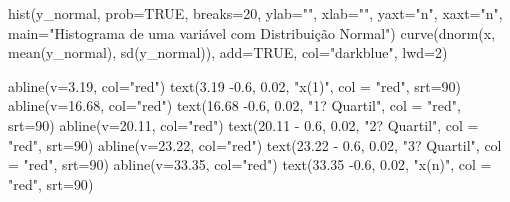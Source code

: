 \documentclass[
]{book}
\newenvironment{Shaded}{\begin{snugshade}}{\end{snugshade}}
\newcommand{\AttributeTok}[1]{\textcolor[rgb]{0.77,0.63,0.00}{#1}}
\newcommand{\ConstantTok}[1]{\textcolor[rgb]{0.00,0.00,0.00}{#1}}
\newcommand{\DecValTok}[1]{\textcolor[rgb]{0.00,0.00,0.81}{#1}}
\newcommand{\FloatTok}[1]{\textcolor[rgb]{0.00,0.00,0.81}{#1}}
\newcommand{\FunctionTok}[1]{\textcolor[rgb]{0.00,0.00,0.00}{#1}}
\newcommand{\NormalTok}[1]{#1}
\newcommand{\SpecialCharTok}[1]{\textcolor[rgb]{0.00,0.00,0.00}{#1}}
\newcommand{\StringTok}[1]{\textcolor[rgb]{0.31,0.60,0.02}{#1}}
\begin{document}
\begin{Shaded}
\begin{Highlighting}[]
\FunctionTok{hist}\NormalTok{(y\_normal, }\AttributeTok{prob=}\ConstantTok{TRUE}\NormalTok{, }\AttributeTok{breaks=}\DecValTok{20}\NormalTok{, }\AttributeTok{ylab=}\StringTok{""}\NormalTok{, }\AttributeTok{xlab=}\StringTok{""}\NormalTok{, }\AttributeTok{yaxt=}\StringTok{"n"}\NormalTok{,  }\AttributeTok{xaxt=}\StringTok{"n"}\NormalTok{, }\AttributeTok{main=}\StringTok{"Histograma de uma variável com Distribuição Normal"}\NormalTok{)}
\FunctionTok{curve}\NormalTok{(}\FunctionTok{dnorm}\NormalTok{(x, }\FunctionTok{mean}\NormalTok{(y\_normal), }\FunctionTok{sd}\NormalTok{(y\_normal)), }\AttributeTok{add=}\ConstantTok{TRUE}\NormalTok{, }\AttributeTok{col=}\StringTok{"darkblue"}\NormalTok{, }\AttributeTok{lwd=}\DecValTok{2}\NormalTok{)}

\FunctionTok{abline}\NormalTok{(}\AttributeTok{v=}\FloatTok{3.19}\NormalTok{, }\AttributeTok{col=}\StringTok{"red"}\NormalTok{) }
\FunctionTok{text}\NormalTok{(}\FloatTok{3.19} \SpecialCharTok{{-}}\FloatTok{0.6}\NormalTok{, }\FloatTok{0.02}\NormalTok{, }\StringTok{"x(1)"}\NormalTok{, }\AttributeTok{col =} \StringTok{"red"}\NormalTok{, }\AttributeTok{srt=}\DecValTok{90}\NormalTok{)}
\FunctionTok{abline}\NormalTok{(}\AttributeTok{v=}\FloatTok{16.68}\NormalTok{, }\AttributeTok{col=}\StringTok{"red"}\NormalTok{) }
\FunctionTok{text}\NormalTok{(}\FloatTok{16.68} \SpecialCharTok{{-}}\FloatTok{0.6}\NormalTok{, }\FloatTok{0.02}\NormalTok{, }\StringTok{"1? Quartil"}\NormalTok{, }\AttributeTok{col =} \StringTok{"red"}\NormalTok{, }\AttributeTok{srt=}\DecValTok{90}\NormalTok{)}
\FunctionTok{abline}\NormalTok{(}\AttributeTok{v=}\FloatTok{20.11}\NormalTok{, }\AttributeTok{col=}\StringTok{"red"}\NormalTok{) }
\FunctionTok{text}\NormalTok{(}\FloatTok{20.11} \SpecialCharTok{{-}} \FloatTok{0.6}\NormalTok{, }\FloatTok{0.02}\NormalTok{, }\StringTok{"2? Quartil"}\NormalTok{, }\AttributeTok{col =} \StringTok{"red"}\NormalTok{, }\AttributeTok{srt=}\DecValTok{90}\NormalTok{)}
\FunctionTok{abline}\NormalTok{(}\AttributeTok{v=}\FloatTok{23.22}\NormalTok{, }\AttributeTok{col=}\StringTok{"red"}\NormalTok{) }
\FunctionTok{text}\NormalTok{(}\FloatTok{23.22} \SpecialCharTok{{-}} \FloatTok{0.6}\NormalTok{, }\FloatTok{0.02}\NormalTok{, }\StringTok{"3? Quartil"}\NormalTok{, }\AttributeTok{col =} \StringTok{"red"}\NormalTok{, }\AttributeTok{srt=}\DecValTok{90}\NormalTok{)}
\FunctionTok{abline}\NormalTok{(}\AttributeTok{v=}\FloatTok{33.35}\NormalTok{, }\AttributeTok{col=}\StringTok{"red"}\NormalTok{) }
\FunctionTok{text}\NormalTok{(}\FloatTok{33.35} \SpecialCharTok{{-}}\FloatTok{0.6}\NormalTok{, }\FloatTok{0.02}\NormalTok{, }\StringTok{"x(n)"}\NormalTok{, }\AttributeTok{col =} \StringTok{"red"}\NormalTok{, }\AttributeTok{srt=}\DecValTok{90}\NormalTok{)}
\end{Highlighting}
\end{Shaded}
\end{document}
